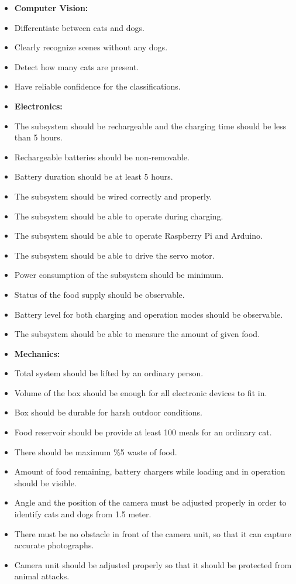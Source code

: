 \begin{itemize}
    \item \textbf{Computer Vision:}
    \item Differentiate between cats and dogs.
    \item Clearly recognize scenes without any dogs. 
    \item Detect how many cats are present.
    \item Have reliable confidence for the classifications.
    \item \textbf{Electronics:}
    \item The subsystem should be rechargeable and the charging time should be less than 5 hours.
    \item Rechargeable batteries should be non-removable.
    \item Battery duration should be at least 5 hours.
    \item The subsystem should be wired correctly and properly.
    \item The subsystem should be able to operate during charging.
    \item The subsystem should be able to operate Raspberry Pi and Arduino.
    \item The subsystem should be able to drive the servo motor.
    \item Power consumption of the subsystem should be minimum. 
    \item Status of the food supply should be observable.
    \item Battery level for both charging and operation modes should be observable.
    \item The subsystem should be able to measure the amount of given food.
    \item \textbf{Mechanics:}
    \item Total system should be lifted by an ordinary person. 
    \item Volume of the box should be enough for all electronic devices to fit in.
    \item Box should be durable for harsh outdoor conditions.
    \item Food reservoir should be provide at least 100 meals for an ordinary cat.
    \item There should be maximum \%5 waste of food. 
    \item Amount of food remaining, battery chargers while loading and in operation should be visible.
    \item Angle and the position of the camera must be adjusted properly in order to identify cats and dogs from 1.5 meter.
    \item There must be no obstacle in front of the camera unit, so that it can capture accurate photographs.
    \item Camera unit should be adjusted properly so that it should be protected from animal attacks.
\end{itemize}